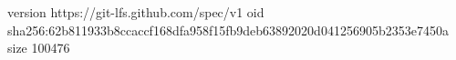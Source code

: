 version https://git-lfs.github.com/spec/v1
oid sha256:62b811933b8ccaccf168dfa958f15fb9deb63892020d041256905b2353e7450a
size 100476
